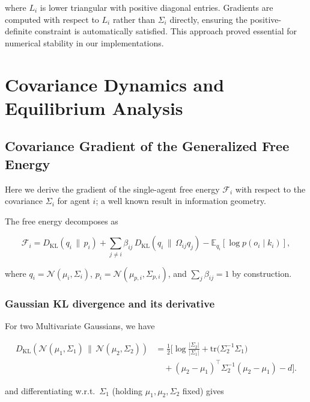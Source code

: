 \documentclass[11pt]{article}
\begin{document}
where $L_i$ is lower triangular with positive diagonal entries. Gradients are computed with respect to $L_i$ rather than $\Sigma_i$ directly, ensuring the positive-definite constraint is automatically satisfied. This approach proved essential for numerical stability in our implementations.






\section{Covariance Dynamics and Equilibrium Analysis}
\label{app:covariance_dynamics}

\subsection{Covariance Gradient of the Generalized Free Energy}

Here we derive the gradient of the single-agent free energy $\mathcal{F}_i$ with respect to the covariance $\Sigma_i$ for agent $i$; a well known result in information geometry.

The free energy decomposes as

\begin{equation}
\mathcal{F}_i
=D_{\mathrm{KL}}(q_i \,\|\, p_i)
+ \sum_{j \neq i} \beta_{ij}\,
D_{\mathrm{KL}}(q_i \,\|\, \Omega_{ij} q_j)
- \mathbb{E}_{q_i}[\log p(o_i \mid k_i)],
\end{equation}

where $q_i = \mathcal{N}(\mu_i, \Sigma_i)$, $p_i = \mathcal{N}(\mu_{p,i}, \Sigma_{p,i})$, and $\sum_j \beta_{ij} = 1$ by construction.

\subsubsection{Gaussian KL divergence and its derivative}

For two Multivariate Gaussians, we have 

\begin{align}
D_{\mathrm{KL}}\!\left(
\mathcal{N}(\mu_1, \Sigma_1)
\,\|\, 
\mathcal{N}(\mu_2, \Sigma_2)
\right)
&=
\frac{1}{2}
\Big[
\log \frac{|\Sigma_2|}{|\Sigma_1|}
+ \mathrm{tr}\!\big(\Sigma_2^{-1}\Sigma_1\big)
\\ &\quad
+ (\mu_2 - \mu_1)^\top
  \Sigma_2^{-1}
  (\mu_2 - \mu_1)
- d
\Big].
\label{eq:gaussian_KL}
\end{align}


and differentiating w.r.t.\ $\Sigma_1$ (holding $\mu_1,\mu_2,\Sigma_2$ fixed) gives
\end{document}
